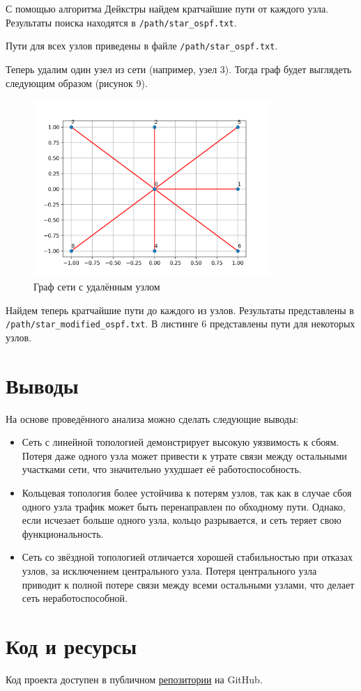 \documentclass[a4paper,14pt]{extarticle}
\begin{document}
С помощью алгоритма Дейкстры найдем кратчайшие пути от каждого узла. Результаты поиска находятся в \texttt{/path/star\_ospf.txt}.



Пути для всех узлов приведены в файле \texttt{/path/star\_ospf.txt}.

Теперь удалим один узел из сети (например, узел 3). Тогда граф будет выглядеть следующим образом (рисунок 9).

\clearpage
\begin{figure}[htbp]
    \centering
    \includegraphics[width=0.8\textwidth]{img/star_modified.png}
    \caption{Граф сети с удалённым узлом}
    \label{fig:hamiltonianGraph}
\end{figure}

Найдем теперь кратчайшие пути до каждого из узлов. Результаты представлены в \texttt{/path/star\_modified\_ospf.txt}. В листинге 6 представлены пути для некоторых узлов.



\section{Выводы}

На основе проведённого анализа можно сделать следующие выводы:

\begin{itemize}
    \item Сеть с линейной топологией демонстрирует высокую уязвимость к сбоям. Потеря даже одного узла может привести к утрате связи между остальными участками сети, что значительно ухудшает её работоспособность.
    \item Кольцевая топология более устойчива к потерям узлов, так как в случае сбоя одного узла трафик может быть перенаправлен по обходному пути. Однако, если исчезает больше одного узла, кольцо разрывается, и сеть теряет свою функциональность.
    \item Сеть со звёздной топологией отличается хорошей стабильностью при отказах узлов, за исключением центрального узла. Потеря центрального узла приводит к полной потере связи между всеми остальными узлами, что делает сеть неработоспособной.
\end{itemize}

\section{Код и ресурсы}
Код проекта доступен в публичном \href{https://github.com/IlyaZawyalow/networks/tree/main/Lab2}{репозитории} на GitHub.
\end{document}
